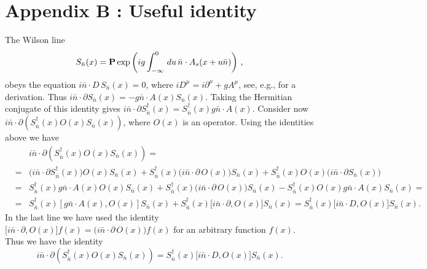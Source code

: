 \appendix
\chapter*{Appendix B : Useful identity}\label{appen_b}
The  Wilson line 
\begin{equation}
S_{\bar n}(x)=\mbox{\bf P}\exp \left( ig\int_{-\infty}^0 \,du \,\bar n\cdot A_s(x+u\bar n) \right)\,,
\end{equation}
obeys the equation $i\bar n\cdot D\,S_{\bar n}(x)=0$, where $iD^\mu=i\partial^\mu+gA^\mu$, see, e.g., \cite{Becher:2014oda} for a derivation.  Thus $i\bar n\cdot\partial S_{\bar n}(x)=-g\bar n\cdot A(x)S_{\bar n}(x)$. Taking the Hermitian conjugate of this identity gives $i\bar n\cdot\partial S^\dagger_{\bar n}(x)=S^\dagger_{\bar n}(x)g\bar n\cdot A(x)$. Consider now $i\bar n\cdot \partial \left(S_{\bar n}^\dagger(x) O(x) S_{\bar n}(x) \right)$, where $O(x)$ is an operator. Using the identities above we have 
\begin{eqnarray}
&&i\bar n\cdot \partial \left(S_{\bar n}^\dagger(x) O(x) S_{\bar n}(x) \right)=\nonumber\\
&=&\big(i\bar n\cdot \partial S_{\bar n}^\dagger(x)\big)O(x) S_{\bar n}(x) +S_{\bar n}^\dagger(x)\big(i\bar n\cdot \partial\, O(x)\big)S_{\bar n}(x) +S_{\bar n}^\dagger(x)O(x) \big(i\bar n\cdot \partial S_{\bar n}(x) \big)\nonumber\\
&=&S^\dagger_{\bar n}(x)g\bar n\cdot A(x)O(x) S_{\bar n}(x) +S_{\bar n}^\dagger(x)\big(i\bar n\cdot \partial\, O(x)\big)S_{\bar n}(x)-S_{\bar n}^\dagger(x) O(x) g\bar n\cdot A(x)S_{\bar n}(x)=\nonumber\\
&=& S^\dagger_{\bar n}(x)[g\bar n\cdot A(x),O(x)] S_{\bar n}(x)+S_{\bar n}^\dagger(x)\big[i\bar n\cdot \partial ,O(x)\big]S_{\bar n}(x)=S_{\bar n}^\dagger(x)\big[i\bar n\cdot D,O(x)\big]S_{\bar n}(x).
\end{eqnarray}
In the last line we have used the identity $\big[i\bar n\cdot \partial ,O(x)\big]f(x)=\big(i\bar n\cdot \partial\, O(x)\big)f(x)$ for an arbitrary function $f(x)$. Thus we have the identity 
 \begin{equation}
 i\bar n\cdot \partial \left(S_{\bar n}^\dagger(x) O(x) S_{\bar n}(x) \right)=S_{\bar n}^\dagger(x)\big[i\bar n\cdot D,O(x)\big]S_{\bar n}(x).
 \end{equation}